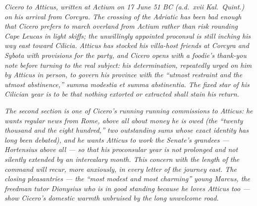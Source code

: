 
\textit{Cicero to Atticus, written at Actium on 17 June 51 BC
(a.d.~xvii Kal.~Quint.) on his arrival from Corcyra. The
crossing of the Adriatic has been bad enough that Cicero
prefers to march overland from Actium rather than risk
rounding Cape Leucas in light skiffs; the unwillingly
appointed proconsul is still inching his way east toward
Cilicia. Atticus has stocked his villa-host friends at
Corcyra and Sybota with provisions for the party, and Cicero
opens with a foodie's thank-you note before turning to the
real subject: his determination, repeatedly urged on him by
Atticus in person, to govern his province with the
``utmost restraint and the utmost abstinence,''
\textit{summa modestia et summa abstinentia}. The fixed star
of his Cilician year is to be that nothing extorted or
extracted shall stain his return.}

\textit{The second section is one of Cicero's running running
commissions to Atticus: he wants regular news from Rome,
above all about money he is owed (the ``twenty thousand
and the eight hundred,'' two outstanding sums whose exact
identity has long been debated), and he wants Atticus to
work the Senate's grandees --- Hortensius above all --- so
that his proconsular year is not prolonged and not silently
extended by an intercalary month. This concern with the
length of the command will recur, more anxiously, in every
letter of the journey east. The closing pleasantries --- the
``most modest and most charming'' young Marcus, the
freedman tutor Dionysius who is in good standing because he
loves Atticus too --- show Cicero's domestic warmth
unbruised by the long unwelcome road.}
